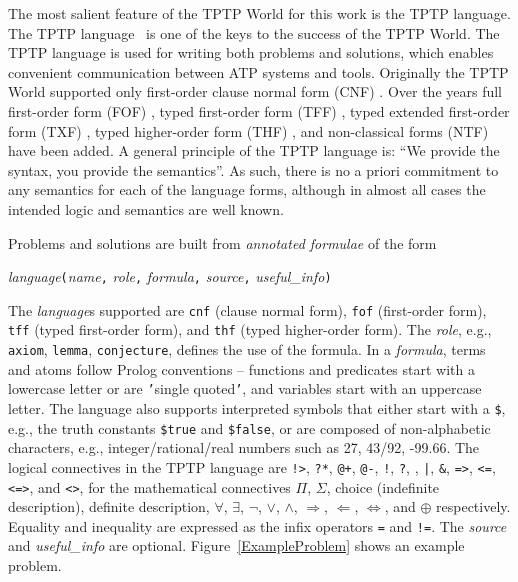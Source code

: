 \documentclass[runningheads]{llncs}
\newcommand{\smalltt}[1]{\small \texttt{#1}}
\newcommand{\mytilde}{\raisebox{0.4ex}{\texttildelow}}
\begin{document}
The most salient feature of the TPTP World for this work is the TPTP language.
The TPTP language~\cite{Sut23-IGPL} is one of the keys to the success of the TPTP World.
The TPTP language is used for writing both problems and solutions,
which enables convenient communication between ATP systems and tools.
Originally the TPTP World supported only first-order clause normal form (CNF)
\cite{SS98-JAR}.
Over the years full first-order form (FOF)
\cite{Sut09}, 
typed first-order form (TFF)
\cite{SS+12,BP13-TFF1}, 
typed extended first-order form (TXF)
\cite{SK18}, 
typed higher-order form (THF)
\cite{SB10,KSR16}, 
and non-classical forms (NTF)~\cite{SF+22} have been added.
A general principle of the TPTP language is: ``We provide the syntax, you provide the semantics''.
As such, there is no a priori commitment to any semantics for each of the language forms, 
although in almost all cases the intended logic and semantics are well known.

Problems and solutions are built from {\em annotated formulae} of the form
\begin{center}
{\em language}{\tt (}{\em name}{\tt ,}
{\em role}{\tt ,}
{\em formula}{\tt ,}
{\em source}{\tt ,}
{\em useful\_info}{\tt )}
\end{center}
The {\em language}s supported are {\smalltt{cnf}} (clause normal form), {\smalltt{fof}}
(first-order form), {\smalltt{tff}} (typed first-order form), and {\smalltt{thf}}
(typed higher-order form).
The {\em role}, e.g., {\smalltt{axiom}}, {\smalltt{lemma}}, {\smalltt{conjecture}}, defines the 
use of the formula.
In a {\em formula}, terms and atoms follow Prolog conventions -- functions and predicates start 
with a lowercase letter or are {\tt '}single quoted{\tt '}, and variables start with an uppercase 
letter.
The language also supports interpreted symbols that either start with a {\tt \$}, e.g., the 
truth constants {\smalltt{\$true}} and {\smalltt{\$false}}, or are composed of 
non-alphabetic characters, e.g., integer/rational/real numbers such as 27, 43/92, -99.66.
The logical connectives in the TPTP language are
{\tt !>}, {\tt ?*}, {\tt @+}, {\tt @-}, {\tt !}, {\tt ?}, {\tt {\mytilde}}, {\tt |}, {\tt \&}, 
{\tt =>}, {\tt <=}, {\tt <=>}, and {\tt <{\mytilde}>}, for the mathematical connectives
$\Pi$, $\Sigma$, choice (indefinite description), definite description,
$\forall$, $\exists$, $\neg$, $\vee$, $\wedge$, $\Rightarrow$, $\Leftarrow$, $\Leftrightarrow$, 
and $\oplus$ respectively.
Equality and inequality are expressed as the infix operators {\tt =} and {\tt !=}.
The {\em source} and {\em useful\_info} are optional.
Figure~\ref{ExampleProblem} shows an example problem.
\end{document}
